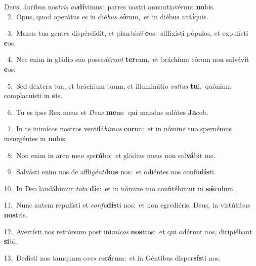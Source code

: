 \lettrine{\initial\textcolor{\initialcolor}{D}}{eus,} áuribus nos\textit{tris} \textit{au}\-\textbf{dí}vimus:~\star patres nostri annuntiavérunt \textbf{no}\-bis.\\
{\numbfont\textcolor{\numbcolor}{~2.}}~Opus, quod operátus es in dié\textit{bus} \textit{e}\-\textbf{ó}rum,~\star et in diébus an\-\textbf{tí}\-quis.\par
{\numbfont\textcolor{\numbcolor}{~3.}}~Manus tua gentes dispérdidit, et plan\-\textit{tás}\-\textit{ti} \textbf{e}\-os:~\star afflixísti pópulos, et expulísti \textbf{e}\-os.\par
{\numbfont\textcolor{\numbcolor}{~4.}}~Nec enim in gládio suo posse\-\textit{dé}\-\textit{runt} \textbf{ter}\-ram,~\star et bráchium eórum non salvávit \textbf{e}\-os:\par
{\numbfont\textcolor{\numbcolor}{~5.}}~Sed déxtera tua, et bráchium tuum, et illuminátio \textit{vul}\-\textit{tus} \textbf{tu}\-i,~\star quóniam complacuísti in \textbf{e}\-is.\par
{\numbfont\textcolor{\numbcolor}{~6.}}~Tu es ipse Rex meus et \textit{De}\-\textit{us} \textbf{me}\-us:~\star qui mandas salútes \textbf{Ja}\-cob.\par
{\numbfont\textcolor{\numbcolor}{~7.}}~In te inimícos nostros ventilá\-\textit{bi}\-\textit{mus} \textbf{cor}\-nu:~\star et in nómine tuo spernémus insurgéntes in \textbf{no}\-bis.\par
{\numbfont\textcolor{\numbcolor}{~8.}}~Non enim in arcu me\textit{o} \textit{spe}\-\textbf{rá}bo:~\star et gládius meus non sal\-\textbf{vá}\-bit me.\par
{\numbfont\textcolor{\numbcolor}{~9.}}~Salvásti enim nos de affli\-\textit{gén}\-\textit{ti}\textbf{bus} nos:~\star et odiéntes nos confu\-\textbf{dís}\-ti.\par
{\numbfont\textcolor{\numbcolor}{10.}}~In Deo laudábimur \textit{to}\-\textit{ta} \textbf{di}\-e:~\star et in nómine tuo confitébimur in \textbf{sǽ}\-culum.\par
{\numbfont\textcolor{\numbcolor}{11.}}~Nunc autem repulísti et \textit{con}\-\textit{fu}\textbf{dís}ti nos:~\star et non egrediéris, Deus, in virtútibus \textbf{nos}\-tris.\par
{\numbfont\textcolor{\numbcolor}{12.}}~Avertísti nos retrórsum post ini\-\textit{mí}\-\textit{cos} \textbf{nos}\-tros:~\star et qui odérunt nos, diripiébant \textbf{si}\-bi.\par
{\numbfont\textcolor{\numbcolor}{13.}}~Dedísti nos tamquam o\textit{ves} \textit{es}\-\textbf{cá}rum:~\star et in Géntibus disper\-\textbf{sís}\-ti nos.\par
